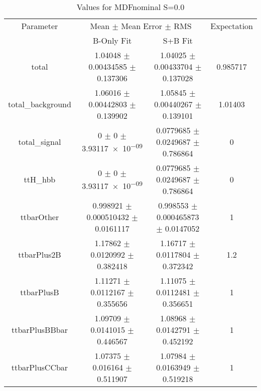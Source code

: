 \begin{table}
\centering
\caption{Values for MDFnominal S=0.0}
\begin{tabular}{cccc}
\toprule
Parameter & \multicolumn{2}{c}{Mean $\pm$ Mean Error $\pm$ RMS} & Expectation\\
 & B-Only Fit & S+B Fit & \\
\midrule
total & \num{1.04048} $\pm$ \num{0.00434585} $\pm$ \num{0.137306} & \num{1.04025} $\pm$ \num{0.00433704} $\pm$ \num{0.137028} & \num{0.985717}\\
total\_background & \num{1.06016} $\pm$ \num{0.00442803} $\pm$ \num{0.139902} & \num{1.05845} $\pm$ \num{0.00440267} $\pm$ \num{0.139101} & \num{1.01403}\\
total\_signal & \num{0} $\pm$ \num{0} $\pm$ \num{3.93117e-09} & \num{0.0779685} $\pm$ \num{0.0249687} $\pm$ \num{0.786864} & \num{0}\\
ttH\_hbb & \num{0} $\pm$ \num{0} $\pm$ \num{3.93117e-09} & \num{0.0779685} $\pm$ \num{0.0249687} $\pm$ \num{0.786864} & \num{0}\\
ttbarOther & \num{0.998921} $\pm$ \num{0.000510432} $\pm$ \num{0.0161117} & \num{0.998553} $\pm$ \num{0.000465873} $\pm$ \num{0.0147052} & \num{1}\\
ttbarPlus2B & \num{1.17862} $\pm$ \num{0.0120992} $\pm$ \num{0.382418} & \num{1.16717} $\pm$ \num{0.0117804} $\pm$ \num{0.372342} & \num{1.2}\\
ttbarPlusB & \num{1.11271} $\pm$ \num{0.0112167} $\pm$ \num{0.355656} & \num{1.11075} $\pm$ \num{0.0112481} $\pm$ \num{0.356651} & \num{1}\\
ttbarPlusBBbar & \num{1.09709} $\pm$ \num{0.0141015} $\pm$ \num{0.446567} & \num{1.08968} $\pm$ \num{0.0142791} $\pm$ \num{0.452192} & \num{1}\\
ttbarPlusCCbar & \num{1.07375} $\pm$ \num{0.016164} $\pm$ \num{0.511907} & \num{1.07984} $\pm$ \num{0.0163949} $\pm$ \num{0.519218} & \num{1}\\
\bottomrule
\end{tabular}
\end{table}